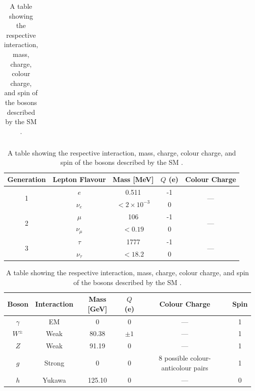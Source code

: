 \documentclass[12pt,a4paper,epsf,portrait,times,epsfig]{report}
\begin{document}
\begin{table} [h!]
\begin{center}
\begin{tabular}{ c|c|c|c|c }
			\end{tabular}
			\caption{A table showing the mass, charge, and colour charge of the quark generations described by the SM \cite{Article:PDG2020}. \mbox{}\\}
			\label{tab:SMQuarks1}
			\begin{tabular}{ c|c|c|c|c }
				\hline \hline
				Generation & Lepton Flavour & Mass [MeV] & $Q$ (e) & Colour Charge \rule{0pt}{2.6ex}\rule[-0.9ex]{0pt}{0pt}\\
				\hline \hline
				\multirow{2}{*}{1} & $e$ & 0.511 & -1 & \multirow{2}{*}{---} \rule{0pt}{2.6ex}\rule[-0.9ex]{0pt}{0pt}\\
				                   & $\nu_{e}$ & $< 2\times10^{-3}$ & 0 & \rule{0pt}{2.6ex}\rule[-0.9ex]{0pt}{0pt}\\
				\hline
				\multirow{2}{*}{2} & $\mu$ & 106 & -1 & \multirow{2}{*}{---} \rule{0pt}{2.6ex}\rule[-0.9ex]{0pt}{0pt}\\
				                   & $\nu_{\mu}$ & $< 0.19$ & 0 & \rule{0pt}{2.6ex}\rule[-0.9ex]{0pt}{0pt}\\
				\hline
				\multirow{2}{*}{3} & $\tau$ & 1777 & -1 & \multirow{2}{*}{---} \rule{0pt}{2.6ex}\rule[-0.9ex]{0pt}{0pt}\\
				                   & $\nu_{\tau}$ & $ < 18.2$ & 0 & \rule{0pt}{2.6ex}\rule[-0.9ex]{0pt}{0pt}\\
				\hline \hline
			\end{tabular}
				\caption{A table showing the mass, charge, and colour charge of the leptons described by the SM \cite{Article:PDG2020}. \mbox{}\\} 
				\label{tab:SMLeptons1}
			\begin{tabular}{ c|c|c|c|c|c }
					\hline \hline
					Boson & Interaction & Mass [GeV] & $Q$ (e) & Colour Charge & Spin \rule{0pt}{2.6ex}\rule[-0.9ex]{0pt}{0pt}\\
					\hline \hline
					$\gamma$ & EM & 0 & 0 & --- & 1 \rule{0pt}{2.6ex}\rule[-0.9ex]{0pt}{0pt}\\
					\hline
					$W^{\pm}$ & Weak & 80.38 & $\pm 1$ & --- & 1 \rule{0pt}{2.6ex}\rule[-0.9ex]{0pt}{0pt}\\ \hline
					$Z$ & Weak & 91.19 & 0 & --- & 1 \rule{0pt}{2.6ex}\rule[-0.9ex]{0pt}{0pt}\\ \hline
					$g$ & Strong & 0 & 0 & 8 possible colour-anticolour pairs & 1 \rule{0pt}{2.6ex}\rule[-0.9ex]{0pt}{0pt}\\ \hline
					$h$ & Yukawa & 125.10 & 0 & --- & 0 \rule{0pt}{2.6ex}\rule[-0.9ex]{0pt}{0pt}\\ 
					\hline \hline
			\end{tabular}
					\caption{A table showing the respective interaction, mass, charge, colour charge, and spin of the bosons described by the SM \cite{Article:PDG2020}. \mbox{}\\}
					\label{tab:SMBosons1} 
		\end{center}
	\end{table}
\end{document}
